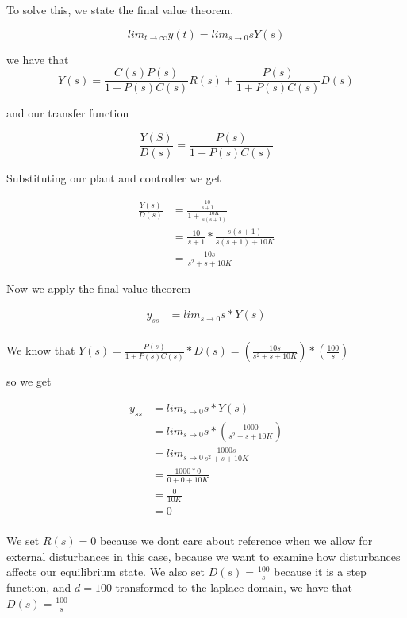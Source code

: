 \documentclass[12pt,A4, onecolumn]{exam}
\begin{document}
\begin{questions}
\begin{parts}
  \begin{solution}
    To solve this, we state the final value theorem.

    \[
       lim_{t\rightarrow \infty} y(t) = lim_{s \rightarrow 0} sY(s)
    \] 

    we have that 
    \[
       Y(s) = \frac{C(s)P(s)} {1+P(s)C(s)}R(s) + \frac{P(s)} {1+P(s)C(s)} D(s)  
    \] 

    and our transfer function 

    \[
       \frac{Y(S)} {D(s)} = \frac{P(s)} {1 + P(s)C(s)} 
    \] 

    Substituting our plant and controller we get

    \begin{align*}
      \frac{Y(s)} {D(s)} &=  \frac{\frac{10} {s+1} } {1+ \frac{10K} {s(s+1)} } \\
      &= \frac{10} {s+1} * \frac{s(s+1)} {s(s+1) + 10K} \\
      &= \frac{10s} {s^2 +s + 10K}  
    \end{align*}

    Now we apply the final value theorem

    \begin{align*}
      y_{ss} &= lim_{s \rightarrow 0} s * Y(s) \\
    \end{align*}

    We know that $ Y(s) = \frac{P(s)} {1 + P(s)C(s)} * D(s) = \left( \frac{10s} {s^2+s+10K} \right) * \left( \frac{100} {s} \right)  $ 
    
    so we get 

    \begin{align*}
      y_{ss} &= lim_{s \rightarrow 0} s * Y(s) \\
      &= lim_{s \rightarrow 0} s * \left( \frac{1000} {s^2+s+10K} \right)\\
      &= lim_{s \rightarrow 0} \frac{1000s} {s^2+s+10K} \\
      &= \frac{1000*0} {0+0+10K} \\
      &= \frac{0} {10K} \\
      &= 0   \\
    \end{align*}
    


    We set $ R(s) =0$ because we dont care about reference when we allow for external disturbances in this case, because we want to examine how disturbances affects our equilibrium state. We also set $ D(s) = \frac{100} {s}  $ because it is a step function, and $ d=100 $   transformed to the laplace domain, we have that $ D(s)=\frac{100} {s}  $   


\end{solution}
\end{parts}
\end{questions}
\end{document}
